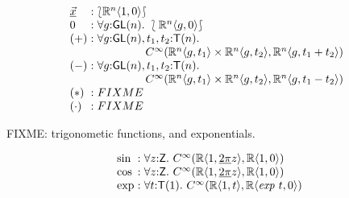 \documentclass[preprint]{sigplanconf}
\newcommand{\typeOfCartSp}[1]{\lbag #1 \rbag}
\theoremstyle{examplestyle}
\begin{document}
\begin{displaymath}
  \begin{array}{l@{\hspace{0.3em}}c@{\hspace{0.3em}}l}
    \underline{\vec{x}} &:& \typeOfCartSp{\mathbb{R}^n\langle 1, 0 \rangle} \\
    0 &:& \forall g \mathord: \mathsf{GL}(n).~\typeOfCartSp{\mathbb{R}^n\langle g, 0 \rangle} \\
    (+) &:&
    \begin{array}[t]{@{}l}
      \forall g \mathord: \mathsf{GL}(n), t_1,t_2 \mathord: \mathsf{T}(n). \\
      \hspace{1.5cm} C^\infty(\mathbb{R}^n\langle g, t_1 \rangle \times \mathbb{R}^n\langle g, t_2 \rangle, \mathbb{R}^n\langle g, t_1 + t_2 \rangle)\\
    \end{array} \\
    (-) &:&
    \begin{array}[t]{@{}l}
      \forall g \mathord: \mathsf{GL}(n), t_1,t_2 \mathord: \mathsf{T}(n). \\
      \hspace{1.5cm} C^\infty(\mathbb{R}^n\langle g, t_1 \rangle \times \mathbb{R}^n\langle g, t_2 \rangle, \mathbb{R}^n\langle g, t_1 - t_2 \rangle)\\
    \end{array} \\
    (*) &:& FIXME \\
    (\cdot) &:& FIXME \\
  \end{array}
\end{displaymath}

FIXME: trigonometic functions, and exponentials.

\begin{displaymath}
  \begin{array}{l@{\hspace{0.3em}}c@{\hspace{0.3em}}l}
    \sin &:& \forall z \mathord: \mathsf{Z}.~C^\infty(\mathbb{R}\langle 1, \underline{2\pi} z \rangle, \mathbb{R} \langle 1, 0 \rangle) \\
    \cos &:& \forall z \mathord: \mathsf{Z}.~C^\infty(\mathbb{R}\langle 1, \underline{2\pi} z \rangle, \mathbb{R} \langle 1, 0 \rangle) \\
    \mathrm{exp} &:& \forall t \mathord: \mathsf{T}(1).~C^\infty(\mathbb{R}\langle 1, t \rangle, \mathbb{R}\langle \mathit{exp}~t, 0 \rangle) \\
  \end{array}
\end{displaymath}
\end{document}
